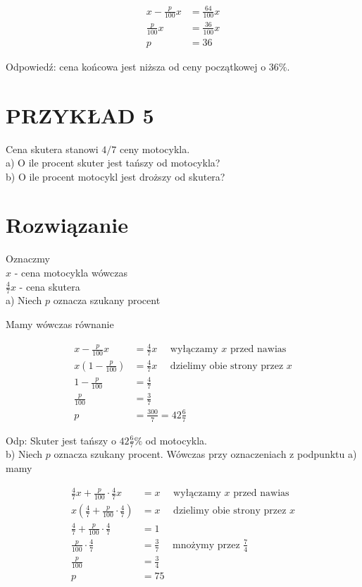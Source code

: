 \documentclass[10pt]{article}
\begin{document}
\[
\begin{aligned}
x-\frac{p}{100} x & =\frac{64}{100} x \\
\frac{p}{100} x & =\frac{36}{100} x \\
p & =36
\end{aligned}
\]

Odpowiedź: cena końcowa jest niższa od ceny początkowej o \(36 \%\).

\section*{PRZYKŁAD 5}
Cena skutera stanowi \(4 / 7\) ceny motocykla.\\
a) O ile procent skuter jest tańszy od motocykla?\\
b) O ile procent motocykl jest droższy od skutera?

\section*{Rozwiązanie}
Oznaczmy\\
\(x\) - cena motocykla wówczas\\
\(\frac{4}{7} x\) - cena skutera\\
a) Niech \(p\) oznacza szukany procent

Mamy wówczas równanie

\[
\begin{aligned}
x-\frac{p}{100} x & =\frac{4}{7} x \quad \text { wyłączamy } x \text { przed nawias } \\
x\left(1-\frac{p}{100}\right) & =\frac{4}{7} x \quad \text { dzielimy obie strony przez } x \\
1-\frac{p}{100} & =\frac{4}{7} \\
\frac{p}{100} & =\frac{3}{7} \\
p & =\frac{300}{7}=42 \frac{6}{7}
\end{aligned}
\]

Odp: Skuter jest tańszy o \(42 \frac{6}{7} \%\) od motocykla.\\
b) Niech \(p\) oznacza szukany procent. Wówczas przy oznaczeniach z podpunktu a) mamy

\[
\begin{aligned}
\frac{4}{7} x+\frac{p}{100} \cdot \frac{4}{7} x & =x \quad \text { wyłączamy } x \text { przed nawias } \\
x\left(\frac{4}{7}+\frac{p}{100} \cdot \frac{4}{7}\right) & =x \quad \text { dzielimy obie strony przez } x \\
\frac{4}{7}+\frac{p}{100} \cdot \frac{4}{7} & =1 \\
\frac{p}{100} \cdot \frac{4}{7} & =\frac{3}{7} \quad \text { mnożymy przez } \frac{7}{4} \\
\frac{p}{100} & =\frac{3}{4} \\
p & =75
\end{aligned}
\]
\end{document}
